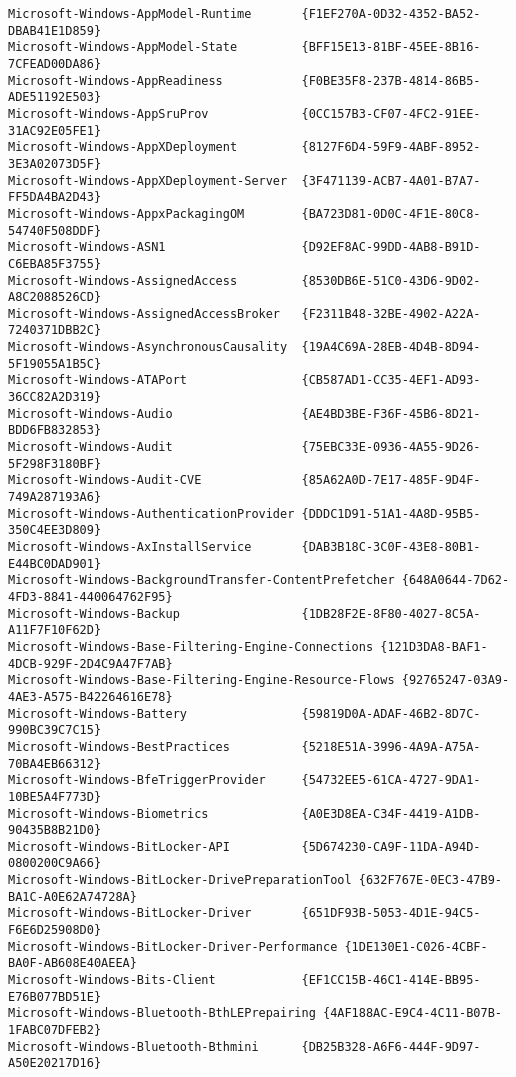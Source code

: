 \documentclass{report}
\begin{document}
\begin{lstlisting}[breaklines=true,basicstyle=\tiny]
Microsoft-Windows-AppModel-Runtime       {F1EF270A-0D32-4352-BA52-DBAB41E1D859}
Microsoft-Windows-AppModel-State         {BFF15E13-81BF-45EE-8B16-7CFEAD00DA86}
Microsoft-Windows-AppReadiness           {F0BE35F8-237B-4814-86B5-ADE51192E503}
Microsoft-Windows-AppSruProv             {0CC157B3-CF07-4FC2-91EE-31AC92E05FE1}
Microsoft-Windows-AppXDeployment         {8127F6D4-59F9-4ABF-8952-3E3A02073D5F}
Microsoft-Windows-AppXDeployment-Server  {3F471139-ACB7-4A01-B7A7-FF5DA4BA2D43}
Microsoft-Windows-AppxPackagingOM        {BA723D81-0D0C-4F1E-80C8-54740F508DDF}
Microsoft-Windows-ASN1                   {D92EF8AC-99DD-4AB8-B91D-C6EBA85F3755}
Microsoft-Windows-AssignedAccess         {8530DB6E-51C0-43D6-9D02-A8C2088526CD}
Microsoft-Windows-AssignedAccessBroker   {F2311B48-32BE-4902-A22A-7240371DBB2C}
Microsoft-Windows-AsynchronousCausality  {19A4C69A-28EB-4D4B-8D94-5F19055A1B5C}
Microsoft-Windows-ATAPort                {CB587AD1-CC35-4EF1-AD93-36CC82A2D319}
Microsoft-Windows-Audio                  {AE4BD3BE-F36F-45B6-8D21-BDD6FB832853}
Microsoft-Windows-Audit                  {75EBC33E-0936-4A55-9D26-5F298F3180BF}
Microsoft-Windows-Audit-CVE              {85A62A0D-7E17-485F-9D4F-749A287193A6}
Microsoft-Windows-AuthenticationProvider {DDDC1D91-51A1-4A8D-95B5-350C4EE3D809}
Microsoft-Windows-AxInstallService       {DAB3B18C-3C0F-43E8-80B1-E44BC0DAD901}
Microsoft-Windows-BackgroundTransfer-ContentPrefetcher {648A0644-7D62-4FD3-8841-440064762F95}
Microsoft-Windows-Backup                 {1DB28F2E-8F80-4027-8C5A-A11F7F10F62D}
Microsoft-Windows-Base-Filtering-Engine-Connections {121D3DA8-BAF1-4DCB-929F-2D4C9A47F7AB}
Microsoft-Windows-Base-Filtering-Engine-Resource-Flows {92765247-03A9-4AE3-A575-B42264616E78}
Microsoft-Windows-Battery                {59819D0A-ADAF-46B2-8D7C-990BC39C7C15}
Microsoft-Windows-BestPractices          {5218E51A-3996-4A9A-A75A-70BA4EB66312}
Microsoft-Windows-BfeTriggerProvider     {54732EE5-61CA-4727-9DA1-10BE5A4F773D}
Microsoft-Windows-Biometrics             {A0E3D8EA-C34F-4419-A1DB-90435B8B21D0}
Microsoft-Windows-BitLocker-API          {5D674230-CA9F-11DA-A94D-0800200C9A66}
Microsoft-Windows-BitLocker-DrivePreparationTool {632F767E-0EC3-47B9-BA1C-A0E62A74728A}
Microsoft-Windows-BitLocker-Driver       {651DF93B-5053-4D1E-94C5-F6E6D25908D0}
Microsoft-Windows-BitLocker-Driver-Performance {1DE130E1-C026-4CBF-BA0F-AB608E40AEEA}
Microsoft-Windows-Bits-Client            {EF1CC15B-46C1-414E-BB95-E76B077BD51E}
Microsoft-Windows-Bluetooth-BthLEPrepairing {4AF188AC-E9C4-4C11-B07B-1FABC07DFEB2}
Microsoft-Windows-Bluetooth-Bthmini      {DB25B328-A6F6-444F-9D97-A50E20217D16}

\end{lstlisting}
\end{document}
